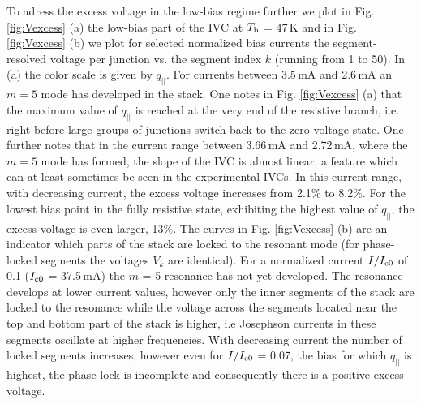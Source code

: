 \documentclass[aps,twocolumn,prb,showpacs,preprintnumbers,superscriptaddress,amsmath,amssymb,longbibliography]{revtex4-1}
\begin{document}
To adress the excess voltage in the low-bias regime further we plot in Fig. \ref{fig:Vexcess} (a) the low-bias part of the IVC at $T_{\rm b}$ = 47\,K and in Fig.  \ref{fig:Vexcess} (b) we plot for selected normalized bias currents the segment-resolved voltage per junction vs. the segment index $k$ (running from 1 to 50). In (a) the color scale is given by $q_{||}$. For currents between 3.5\,mA and 2.6\,mA an $m = 5$ mode has developed in the stack.  One  notes in Fig.  \ref{fig:Vexcess} (a) that the maximum value of $q_{||}$ is reached at the very end of the resistive branch, i.e. right before large groups of junctions switch back to the zero-voltage state. One further notes that in the current range between 3.66\,mA and 2.72\,mA, where the $m = 5$ mode has formed, the slope of the IVC is almost linear, a feature which can at least sometimes be seen in the experimental IVCs. In this current range, with decreasing current, the excess voltage increases from 2.1$\%$ to 8.2$\%$. For the lowest bias point in the fully resistive state, exhibiting the highest value of $q_{||}$, the excess voltage is even larger, 13$\%$. The curves in Fig. \ref{fig:Vexcess} (b) are an indicator which parts of the stack are locked to the resonant mode (for phase-locked segments the voltages $V_k$ are identical). For a normalized current $I/I_{\rm c0}$ of 0.1 ($I_{\rm c0}$ = 37.5\,mA) the $m$ = 5 resonance has not yet developed. The resonance develops at lower current values, however only the inner segments of the stack are locked to the resonance while the voltage across the segments located near the top and bottom part of the stack is higher, i.e Josephson currents in these segments oscillate at higher frequencies. 
With decreasing current the number of locked segments increases, however even for $I/I_{\rm c0}$ = 0.07, the bias for which $q_{||}$ is highest, the phase lock is incomplete and consequently there is a positive excess voltage.
\end{document}
